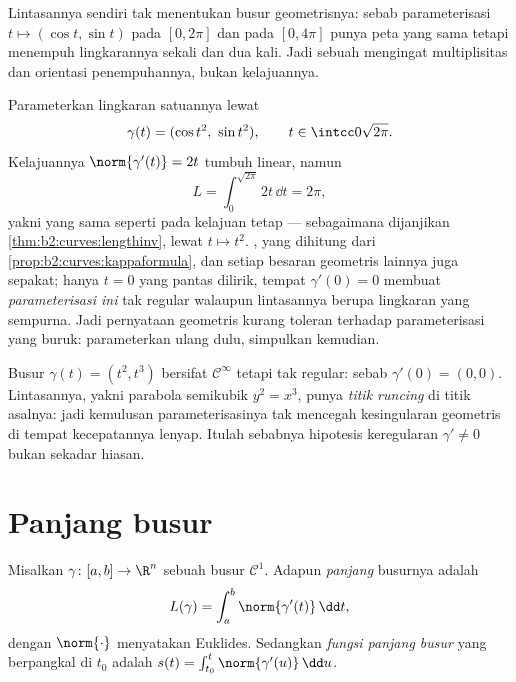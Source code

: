 \begin{remark}
Lintasannya sendiri tak menentukan busur geometrisnya: sebab
parameterisasi $t \mapsto (\cos t, \sin t)$ pada $[0, 2\pi]$ dan pada
$[0, 4\pi]$ punya peta yang sama tetapi menempuh lingkarannya sekali dan
dua kali. Jadi sebuah  mengingat multiplisitas dan orientasi
penempuhannya, bukan kelajuannya.
\end{remark}

\begin{example}\label{ex:b2:curves:speedinvariance}
Parameterkan lingkaran satuannya lewat
\[
\gamma(t) = (\cos t^2,\ \sin t^2),
\qquad t \in \intcc0{\sqrt{2\pi}} .
\]
Kelajuannya $\norm{\gamma'(t)} = 2t$ tumbuh linear, namun
\[
L = \int_0^{\sqrt{2\pi}}2t\,\dd t = 2\pi ,
\]
yakni  yang sama seperti pada kelajuan tetap --- sebagaimana
dijanjikan \cref{thm:b2:curves:lengthinv}, lewat  $t \mapsto t^2$. ,  yang
dihitung dari \cref{prop:b2:curves:kappaformula}, dan setiap
besaran geometris lainnya juga sepakat; hanya $t = 0$
yang pantas dilirik, tempat $\gamma'(0) = 0$ membuat \emph{parameterisasi
ini} tak regular walaupun lintasannya berupa
lingkaran yang sempurna. Jadi pernyataan geometris kurang toleran terhadap
parameterisasi yang buruk: parameterkan ulang dulu, simpulkan
kemudian.
\end{example}

\begin{example}\label{ex:b2:curves:cusp}
Busur $\gamma(t) = (t^2, t^3)$ bersifat $\mathcal{C}^\infty$ tetapi tak
regular: sebab $\gamma'(0) = (0, 0)$. Lintasannya, yakni parabola
semikubik $y^2 = x^3$, punya \emph{titik runcing} di titik asalnya: jadi kemulusan
parameterisasinya tak mencegah kesingularan geometris
di tempat kecepatannya lenyap. Itulah sebabnya hipotesis keregularan
$\gamma' \neq 0$ bukan sekadar hiasan.
\end{example}

\section{Panjang busur}

\begin{definition}\label{def:b2:curves:length}
Misalkan $\gamma \colon [a, b] \to \R^n$ sebuah busur $\mathcal{C}^1$. Adapun
\emph{panjang} busurnya adalah
\[
L(\gamma) = \int_a^b \norm{\gamma'(t)}\, \dd t ,
\]
dengan $\norm{\cdot}$ menyatakan  Euklides. Sedangkan \emph{fungsi panjang
busur} yang berpangkal di $t_0$ adalah $s(t) = \int_{t_0}^t
\norm{\gamma'(u)}\,\dd u$.
\end{definition}

